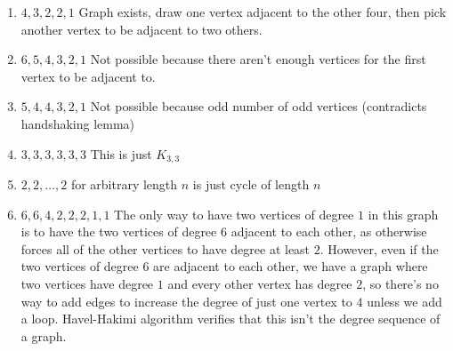 \begin{enumerate}
    \newpage
    \begin{enumerate}
     \item $4, 3, 2, 2, 1$ Graph exists, draw one vertex adjacent to the other four, then pick another vertex to be adjacent to two others.  
        \item $6, 5, 4, 3, 2, 1$
        Not possible because there aren't enough vertices for the first vertex to be adjacent to.
        \item $5, 4, 4, 3, 2, 1$
        Not possible because odd number of odd vertices (contradicts handshaking lemma)
        \item $3, 3, 3, 3, 3, 3$
        This is just $K_{3,3}$
        \item $2, 2, \dots, 2$ for arbitrary length $n$ is just cycle of length $n$
        \item $6, 6, 4, 2, 2, 2, 1, 1$ The only way to have two vertices of degree $1$ in this graph is to have the two vertices of degree $6$ adjacent to each other, as otherwise forces all of the other vertices to have degree at least $2$. However, even if the two vertices of degree $6$ are adjacent to each other, we have a graph where two vertices have degree $1$ and every other vertex has degree $2$, so there's no way to add edges to increase the degree of just one vertex to $4$ unless we add a loop. Havel-Hakimi algorithm verifies that this isn't the degree sequence of a graph.
    \end{enumerate}


\end{enumerate}
